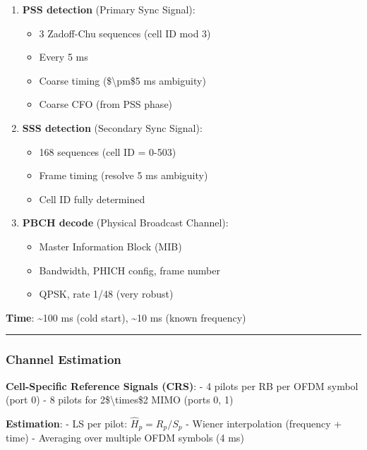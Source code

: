 \begin{enumerate}
\def\labelenumi{\arabic{enumi}.}
\tightlist
\item
  \textbf{PSS detection} (Primary Sync Signal):

  \begin{itemize}
  \tightlist
  \item
    3 Zadoff-Chu sequences (cell ID mod 3)
  \item
    Every 5 ms
  \item
    Coarse timing (\$\textbackslash pm\$5 ms ambiguity)
  \item
    Coarse CFO (from PSS phase)
  \end{itemize}
\item
  \textbf{SSS detection} (Secondary Sync Signal):

  \begin{itemize}
  \tightlist
  \item
    168 sequences (cell ID = 0-503)
  \item
    Frame timing (resolve 5 ms ambiguity)
  \item
    Cell ID fully determined
  \end{itemize}
\item
  \textbf{PBCH decode} (Physical Broadcast Channel):

  \begin{itemize}
  \tightlist
  \item
    Master Information Block (MIB)
  \item
    Bandwidth, PHICH config, frame number
  \item
    QPSK, rate 1/48 (very robust)
  \end{itemize}
\end{enumerate}

\textbf{Time}: \textasciitilde100 ms (cold start), \textasciitilde10 ms
(known frequency)

\begin{center}\rule{0.5\linewidth}{0.5pt}\end{center}

\subsubsection{Channel Estimation}\label{channel-estimation}

\textbf{Cell-Specific Reference Signals (CRS)}: - 4 pilots per RB per
OFDM symbol (port 0) - 8 pilots for 2\$\textbackslash times\$2 MIMO
(ports 0, 1)

\textbf{Estimation}: - LS per pilot: \(\hat{H}_p = R_p / S_p\) - Wiener
interpolation (frequency + time) - Averaging over multiple OFDM symbols
(4 ms)

